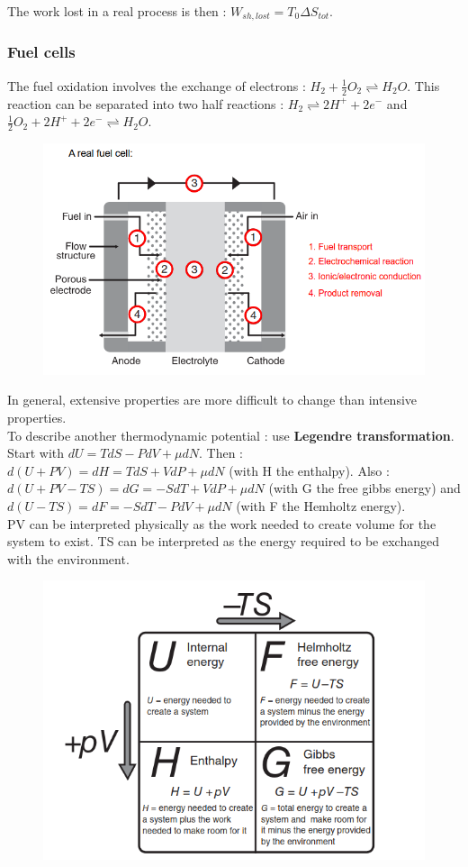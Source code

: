 \documentclass[../main.tex]{subfiles}
\begin{document}
The work lost in a real process is then : $W_{sh,lost} = T_0 \Delta S_{tot}$.\\

\subsubsection{Fuel cells}
The fuel oxidation involves the exchange of electrons : $H_2 + \frac{1}{2} O_2 \rightleftharpoons H_2 O$. This reaction can be separated into two half reactions : $H_2 \rightleftharpoons  2H^++2e^-$ and $\frac{1}{2}O_2 +2H^+ +2e^- \rightleftharpoons H_2O$.\\

\begin{figure}[hbt!]
    \centering
    \includegraphics[width=0.5\linewidth]{IMAGES/ESE/Screenshot from 2025-03-11 16-21-36.png}
\end{figure}

In general, extensive properties are more difficult to change than intensive properties. \\
To describe another thermodynamic potential : use \textbf{Legendre transformation}. Start with $dU = TdS - PdV  + \mu dN$. Then : $d(U+PV) = dH = TdS + VdP + \mu dN$ (with H the enthalpy). Also : $d(U+PV-TS) = dG = -SdT + VdP +\mu dN$ (with G the free gibbs energy) and $d(U-TS) = dF = -SdT -PdV+ \mu dN$ (with F the Hemholtz energy).\\
\warning PV can be interpreted physically as the work needed to create volume for the system to exist. TS can be interpreted as the energy required to be exchanged with the environment.\\

\begin{figure}[hbt!]
    \centering
    \includegraphics[width=0.6\linewidth]{IMAGES/ESE/Screenshot from 2025-03-11 16-36-43.png}
\end{figure}
\end{document}
